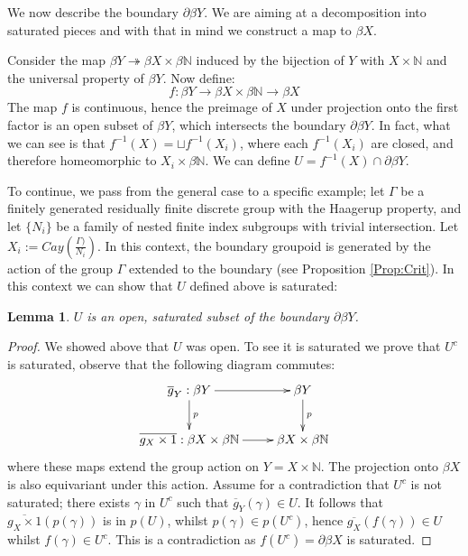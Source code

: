 \documentclass[11pt]{amsart}
\theoremstyle{plain}
\newtheorem{lemma}[theorem]{Lemma}%
\theoremstyle{definition}%
\theoremstyle{remark}%
\begin{document}
We now describe the boundary $\partial\beta Y$. We are aiming at a decomposition into saturated pieces and with that in mind we construct a map to $\beta X$.

Consider the map $\beta Y \twoheadrightarrow \beta X \times \beta \mathbb{N}$ induced by the bijection of $Y$ with $X \times \mathbb{N}$ and the universal property of $\beta Y$. Now define:
\begin{equation*}
f: \beta Y \rightarrow \beta X \times \beta \mathbb{N} \rightarrow \beta X
\end{equation*}
The map $f$ is continuous, hence the preimage of $X$ under projection onto the first factor is an open subset of $\beta Y$, which intersects the boundary $\partial \beta Y$. In fact, what we can see is that $f^{-1}(X)= \sqcup f^{-1}(X_{i})$, where each $f^{-1}(X_{i})$ are closed, and therefore homeomorphic to $X_{i} \times \beta \mathbb{N}$. We can define $U = f^{-1}(X)\cap \partial\beta Y$.

To continue, we pass from the general case to a specific example; let $\Gamma$ be a finitely generated residually finite discrete group with the Haagerup property, and let $\lbrace N_{i}\rbrace$ be a family of nested finite index subgroups with trivial intersection. Let $X_{i}:=Cay(\frac{\Gamma)}{N_{i}})$. In this context, the boundary groupoid is generated by the action of the group $\Gamma$ extended to the boundary (see Proposition \ref{Prop:Crit}). In this context we can show that $U$ defined above is saturated:

\begin{lemma}
$U$ is an open, saturated subset of the boundary $\partial\beta Y$. 
\end{lemma}
\begin{proof}
We showed above that $U$ was open. To see it is saturated we prove that $U^{c}$ is saturated, observe that the following diagram commutes:
\begin{equation*}
\xymatrix{
\overline{g}_{Y}:\beta Y\ar[r]\ar[d]^{p} & \beta Y\ar[d]^{p}\\
\overline{g_{X} \times 1}:  \beta X \times \beta \mathbb{N} \ar[r] & \beta X \times \beta \mathbb{N}
}
\end{equation*}
where these maps extend the group action on $Y=X \times \mathbb{N}$. The projection onto $\beta X$ is also equivariant under this action. Assume for a contradiction that $U^{c}$ is not saturated; there exists $\gamma$ in $U^{c}$ such that $\overline{g}_{Y}(\gamma) \in U$. It follows that $\overline{g_{X} \times 1}(p(\gamma))$ is in $p(U)$, whilst $p(\gamma) \in p(U^{c})$, hence $\overline{g_{X}}(f(\gamma))\in U$ whilst $f(\gamma) \in U^{c}$. This is a contradiction as $f(U^{c}) = \partial\beta X$ is saturated.
\end{proof}
\end{document}
